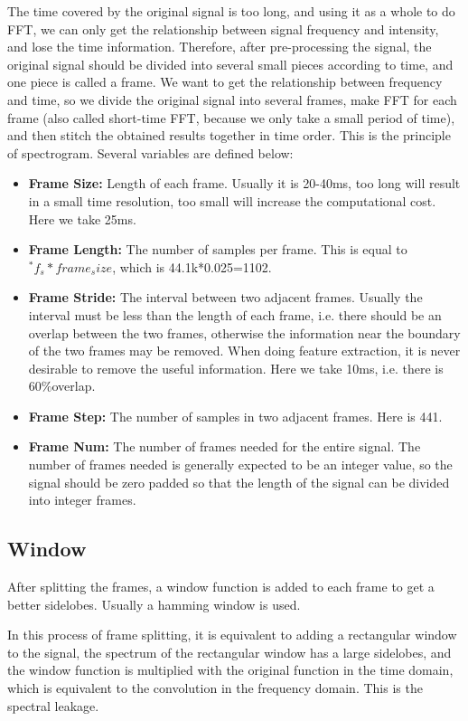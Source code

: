 The time covered by the original signal is too long, and using it as a whole to do FFT, we can only get the relationship between signal frequency and intensity, and lose the time information. Therefore, after pre-processing the signal, the original signal should be divided into several small pieces according to time, and one piece is called a frame. We want to get the relationship between frequency and time, so we divide the original signal into several frames, make FFT for each frame (also called short-time FFT, because we only take a small period of time), and then stitch the obtained results together in time order. This is the principle of spectrogram.
Several variables are defined below:
\begin{itemize}
	\item \textbf{Frame Size:} Length of each frame. Usually it is 20-40ms, too long will result in a small time resolution, too small will increase the computational cost. Here we take 25ms.
	\item \textbf{Frame Length:} The number of samples per frame. This is equal to ${ }^{*} f_{s}*frame_size$, which is 44.1k*0.025=1102.
	\item \textbf{Frame Stride:} The interval between two adjacent frames. Usually the interval must be less than the length of each frame, i.e. there should be an overlap between the two frames, otherwise the information near the boundary of the two frames may be removed. When doing feature extraction, it is never desirable to remove the useful information. Here we take 10ms, i.e. there is $60 \%$overlap.
	\item \textbf{Frame Step:} The number of samples in two adjacent frames. Here is 441.
	\item \textbf{Frame Num:} The number of frames needed for the entire signal. The number of frames needed is generally expected to be an integer value, so the signal should be zero padded so that the length of the signal can be divided into integer frames.
\end{itemize}

\subsection{Window}

After splitting the frames, a window function is added to each frame to get a better sidelobes. Usually a hamming window is used.

In this process of frame splitting, it is equivalent to adding a rectangular window to the signal, the spectrum of the rectangular window has a large sidelobes, and the window function is multiplied with the original function in the time domain, which is equivalent to the convolution in the frequency domain. This is the spectral leakage.

